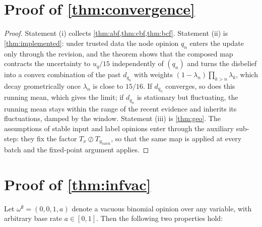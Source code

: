 \section{Proof of \cref{thm:convergence}}
\begin{proof}
Statement (i) collects \cref{thm:abf,thm:cbf,thm:bcf}. Statement (ii) is \cref{thm:implemented}: under trusted data the node opinion $q_n$ enters the update only through the revision, and the theorem shows that the composed map contracts the uncertainty to $u_q/15$ independently of $(q_n)$ and turns the disbelief into a convex combination of the past $d_{q_n}$ with weights $(1 - \lambda_n)\prod_{k > n}\lambda_k$, which decay geometrically once $\lambda_n$ is close to $15/16$. If $d_{q_n}$ converges, so does this running mean, which gives the limit; if $d_{q_n}$ is stationary but fluctuating, the running mean stays within the range of the recent evidence and inherits its fluctuations, damped by the window. Statement (iii) is \cref{thm:geo}. The assumptions of stable input and label opinions enter through the auxiliary sub-step: they fix the factor $T_x \oslash T_{y_\text{batch}}$, so that the same map is applied at every batch and the fixed-point argument applies.
\end{proof}

\section{Proof of \cref{thm:infvac}}

Let \( \omega^\emptyset = (0, 0, 1, a) \) denote a vacuous binomial opinion over any variable, with arbitrary base rate \( a \in [0, 1] \). Then the following two properties hold:

